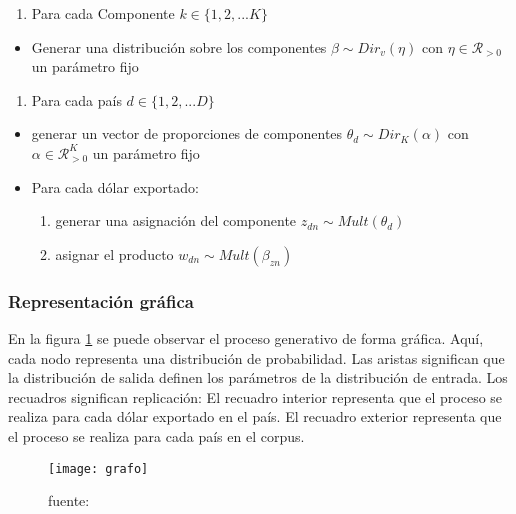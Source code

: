 \documentclass[class=article, crop=false]{standalone}
\begin{document}
\begin{enumerate}
\def\labelenumi{\arabic{enumi}.}
\item
Para cada Componente $k \in \{1,2,... K\}$
\end{enumerate}

\begin{itemize}
\item
Generar una distribución sobre los componentes
$\beta \sim Dir_v(\eta)$ con $\eta \in \mathcal{R}_{>0}$ un
parámetro fijo
\end{itemize}

\begin{enumerate}
\def\labelenumi{\arabic{enumi}.}
\setcounter{enumi}{1}
\item
Para cada país $d \in \{1,2,... D\}$
\end{enumerate}

\begin{itemize}
\item
generar un vector de proporciones de componentes
$\theta_d \sim Dir_K(\alpha)$ con $\alpha \in \mathcal{R}_{>0}^K$
un parámetro fijo
\item
Para cada dólar exportado:

\begin{enumerate}
	\def\labelenumi{\roman{enumi}.}
	\item
	generar una asignación del componente $z_{dn} \sim Mult(\theta_d)$
	\item
	asignar el producto $w_{dn} \sim Mult(\beta_{zn})$
\end{enumerate}
\end{itemize}


\subsubsection{Representación gráfica}

En la figura \ref{fig:grafo_blei} se puede observar el proceso generativo de forma gráfica. Aquí, cada nodo representa una distribución de probabilidad. Las aristas significan que la distribución de salida definen los parámetros de la distribución de entrada. Los recuadros significan replicación: El recuadro interior representa que el proceso se realiza para cada dólar exportado en el país. El recuadro exterior representa que el proceso se realiza para cada
país en el corpus.


\begin{figure}
	\centering	
	\texttt{[image: grafo]}
	\caption{fuente: \cite{blei2003latent}}
	\label{fig:grafo_blei}
\end{figure}
\end{document}
